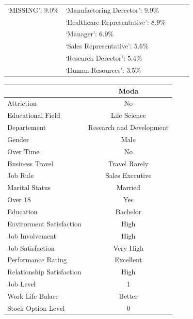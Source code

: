 \documentclass[a4paper,9pt]{article}
\begin{document}
\begin{center}
\begin{tabular}{lllll}
`MISSING': $9.0\%$ &`Manufactoring Derector': $9.9\%$ &     &       &      \\
\rowcolor[gray]{0.9}
                               &`Healthcare Representative': $8.9\%$ &     &       &      \\
                               &`Manager': $6.9\%$ &     &       &      \\
\rowcolor[gray]{0.9}
                               &`Sales Representative': $5.6\%$ &     &       &      \\
                               &`Research Derector': $5.4\%$ &     &       &      \\
\rowcolor[gray]{0.9}
                               &`Human Resources': $3.5\%$ &     &       &      \\
\bottomrule
\end{tabular}
\end{center}


\begin{center}\footnotesize
\begin{tabular}{lc}
\toprule
 &\bfseries Moda \\
\hline
\hline
\rowcolor[gray]{0.9}
Attriction & No\\
Educational Field & Life Science\\
\rowcolor[gray]{0.9}
Departement & Research and Development\\
Gender & Male\\
\rowcolor[gray]{0.9}
Over Time & No\\
Business Travel & Travel Rarely\\
\rowcolor[gray]{0.9}
Job Rule & Sales Executive\\
Marital Status & Married \\
\rowcolor[gray]{0.9}
Over 18 & Yes\\ 
Education & Bachelor\\
\rowcolor[gray]{0.9}
Envirorment Satisfaction & High\\
Job Involvement & High\\
\rowcolor[gray]{0.9}
Job Satisfaction & Very High\\
Performance Rating & Excellent\\
\rowcolor[gray]{0.9}
Relationship Satisfaction & High\\
Job Level & 1\\
\rowcolor[gray]{0.9}
Work Life Balace & Better\\
Stock Option Level & 0\\
\bottomrule 
\end{tabular}
\end{center}
 
\end{document}
